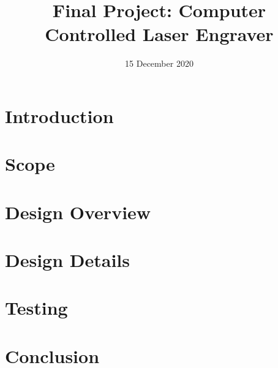 \documentclass[11pt]{LaTeX-Classes/math-hw}
\title{Final Project: Computer Controlled Laser Engraver}
\date{15 December 2020}
\begin{document}
\maketitle

\section*{Introduction}
\section*{Scope}
\section*{Design Overview}
\section*{Design Details}
\section*{Testing}
\section*{Conclusion}

\end{document}

